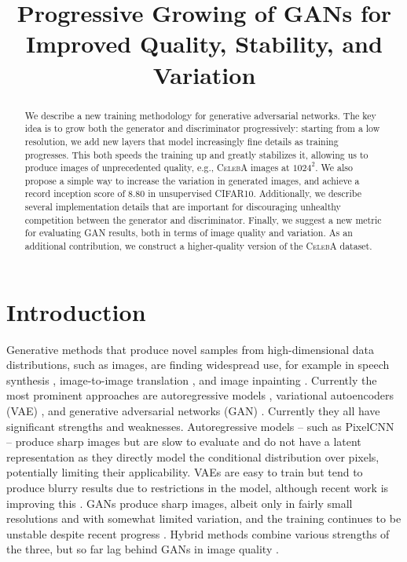 \title{Progressive Growing of GANs for Improved Quality, Stability, and Variation}

\begin{abstract}
We describe a new training methodology for generative adversarial networks. The key idea is to grow both the generator and discriminator progressively: starting from a low resolution, we add new layers that model increasingly fine details as training progresses. This both speeds the training up and greatly stabilizes it, allowing us to produce images of unprecedented quality, e.g., \textsc{CelebA} images at $1024^2$. We also propose a simple way to increase the variation in generated images, and achieve a record inception score of $8.80$ in unsupervised \textsc{CIFAR10}. Additionally, we describe several implementation details that are important for discouraging unhealthy competition between the generator and discriminator. Finally, we suggest a new metric for evaluating GAN results, both in terms of image quality and variation. As an additional contribution, we construct a higher-quality version of the \textsc{CelebA} dataset.
\end{abstract}

\section{Introduction}
\label{sec:intro}

Generative methods that produce novel samples from high-dimensional data distributions, such as images, are finding widespread use, for example in speech synthesis \citep{VanDenOord2016C}, image-to-image translation \citep{Zhu2017,Liu2017B,Wang2017}, and image inpainting \citep{Iizuka2017}. Currently the most prominent approaches are autoregressive models \citep{VanDenOord2016A,VanDenOord2016B}, variational autoencoders (VAE) \citep{Kingma2014}, and generative adversarial networks (GAN) \citep{Goodfellow2014}. Currently they all have significant strengths and weaknesses. Autoregressive models -- such as PixelCNN -- produce sharp images but are slow to evaluate and do not have a latent representation as they directly model the conditional distribution over pixels, potentially limiting their applicability. VAEs are easy to train but tend to produce blurry results due to restrictions in the model, although recent work is improving this \citep{Kingma2016}. GANs produce sharp images, albeit only in fairly small resolutions and with somewhat limited variation, and the training continues to be unstable despite recent progress \citep{Salimans2016B, Gulrajani2017, Berthelot2017,Kodali2017}. Hybrid methods combine various strengths of the three, but so far lag behind GANs in image quality \citep{Makhzani2017,Ulyanov2017,Dumoulin2016}.

